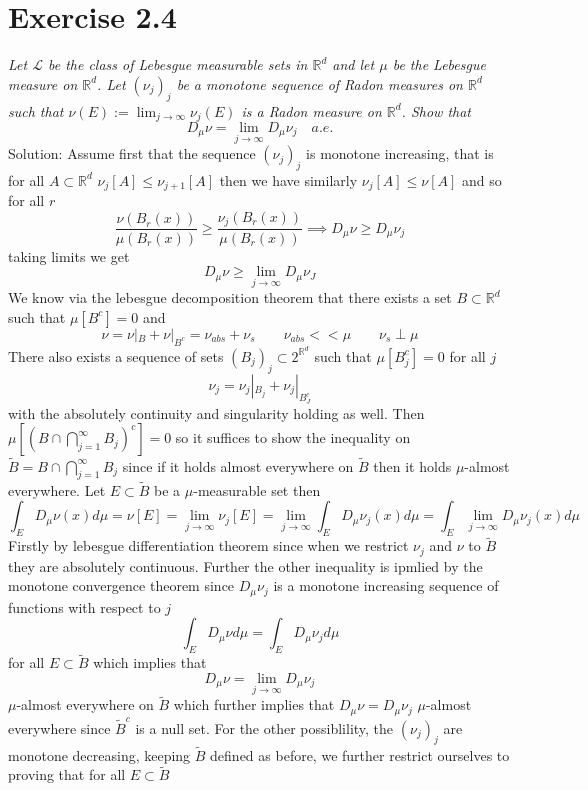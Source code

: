 \documentclass[11pt]{article}
\newcommand{\solution}[1]{{{\textcolor{header}{Solution:} \textcolor{solution}{#1}}}}
\begin{document}
\section{Exercise 2.4}
\emph{
    Let $\mathcal{L}$ be the class of Lebesgue measurable sets in  $ \mathbb{R}^{d}$ and let $\mu$
    be the Lebesgue measure on $ \mathbb{R}^{d}$. Let $(\nu_j)_j$ be a monotone sequence of Radon measures on  $ \mathbb{R}^{d}$ such
    that $\nu(E) := \lim_{j\to \infty}\nu_j(E)$ is a Radon measure on $ \mathbb{R}^{d}$. Show that
    \[
    D_\mu\nu = \lim_{j\to \infty} D_\mu\nu_j \quad a.e.
    \] 
}
\solution{
    Assume first that the sequence $(\nu_j)_j$ is monotone increasing, that is for all  $A \subset \mathbb{R}^{d}$ $\nu_j[A] \le \nu_{j+1}[A]$ then we have similarly $\nu_j[A] \le \nu[A]$ and so for all $r$
\[
    \frac{\nu(B_r(x))}{\mu(B_r(x))} \ge \frac{\nu_j(B_r(x))}{\mu(B_r(x))} \implies D_\mu \nu \ge D_\mu \nu_j
\] 
taking limits we get
\[
D_\mu \nu \ge \lim_{j\to \infty} D_\mu \nu_J
\] 
We know via the lebesgue decomposition theorem that there exists a set $B \subset \mathbb{R}^{d}$ such that $\mu[B^{c}] = 0$ and
\[
    \nu = \nu|_B + \nu|_{B^{c}} = \nu_{abs} + \nu_s \qquad \nu_{abs} << \mu \qquad \nu_{s} \perp \mu
\] 
There also exists a sequence of sets $(B_j)_j \subset 2^{\mathbb{R}^{d}}$ such that $\mu[B_j^{c}] = 0$ for all $j$
\[
    \nu_j = \nu_j|_{B_j} + \nu_j|_{B_J^{c}}
\] 
with the absolutely continuity and singularity holding as well. Then $\mu[(B \cap \bigcap_{j=1}^{\infty}B_j)^{c}] = 0$
so it suffices to show the inequality on $\tilde B = B \cap \bigcap_{j=1}^{\infty}B_j$ since if it holds almost everywhere on  $\tilde B$ then it holds $\mu$-almost everywhere. Let $E \subset \tilde B$ be a $\mu$-measurable set then
\[
    \int_{E}^{} D_\mu \nu(x) d \mu = \nu[E] = \lim_{j\to\infty }\nu_j[E] = \lim_{j\to\infty } \int_{E}^{}D_\mu \nu_j(x) d \mu = \int_{E}^{} \lim_{j\to \infty} D_\mu \nu_j(x) d \mu
\] 
Firstly by lebesgue differentiation theorem since when we restrict $\nu_j$ and  $\nu$ to  $\tilde B$ they are absolutely continuous. Further the other inequality is ipmlied by the monotone convergence theorem since $D_\mu \nu_j$ is a monotone increasing sequence of functions with respect to $j$
\[
\int_{E}^{}D_\mu \nu d \mu = \int_{E}^{} D_\mu \nu_j d \mu
\] 
for all $E \subset \tilde B$ which implies that
\[
D_\mu \nu =  \lim_{j\to \infty} D_\mu \nu_j 
\] 
$\mu$-almost everywhere on $\tilde B$ which further implies that  $D_\mu \nu = D_\mu \nu_j$ $\mu$-almost everywhere since $\tilde B^{c}$ is a null set.
For the other possiblility, the $(\nu_j)_j$ are monotone decreasing, keeping $\tilde B$ defined as before, we further restrict ourselves to proving that for all  $E \subset \tilde B$
}
\end{document}
